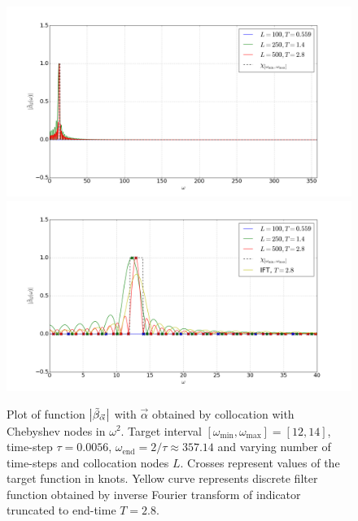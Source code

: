 \documentclass[a4paper,11pt,bibliography=totoc,listof=totoc,headinclude=true,cleardoublepage=empty,oneside]{scrbook}
\newcommand{\dffv}{\Tilde{\beta}_{\Vec{\alpha}}}
\newcommand{\e}{\mathrm{end}}
\begin{document}
\begin{figure}
    \centering
    \includegraphics[width=1\linewidth]{latex//images//cheb_coll/Figure_1.png}
    \includegraphics[width=1\linewidth]{latex//images//cheb_coll/Figure_2.png}
    \caption{Plot of function $\left|\dffv\right|$ with $\Vec{\alpha}$ obtained by collocation with Chebyshev nodes in $\omega^2$. Target interval $\left[\omega_{\min}, \omega_{\max} \right] = [12, 14]$, time-step $\tau = 0.0056$, $\omega_\e = 2/\tau \approx 357.14$ and varying number of time-steps and collocation nodes $L$. Crosses represent values of the target function in knots. Yellow curve represents discrete filter function obtained by inverse Fourier transform of indicator truncated to end-time $T=2.8$.}
    \label{fig:cheb coll 1}
\end{figure}
\end{document}
